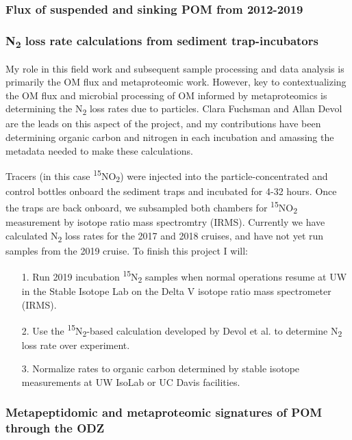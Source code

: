 \documentclass[12pt, letterpaper, twoside]{article}
\begin{document}
\bigskip

\subsubsection{Flux of suspended and sinking POM from 2012-2019}



\subsubsection{N\textsubscript{2} loss rate calculations from sediment trap-incubators}

My role in this field work and subsequent sample processing and data analysis is primarily the OM flux and metaproteomic work. However, key to contextualizing the OM flux and microbial processing of OM informed by metaproteomics is determining the N\textsubscript{2} loss rates due to particles. Clara Fuchsman and Allan Devol are the leads on this aspect of the project, and my contributions have been determining organic carbon and nitrogen in each incubation and amassing the metadata needed to make these calculations. 

Tracers (in this case \textsuperscript{15}NO\textsubscript{2}) were injected into the particle-concentrated and control bottles onboard the sediment traps and incubated for 4-32 hours. Once the traps are back onboard, we subsampled both chambers for \textsuperscript{15}NO\textsubscript{2} measurement by isotope ratio mass spectromtry (IRMS). Currently we have calculated N\textsubscript{2} loss rates for the 2017 and 2018 cruises, and have not yet run samples from the 2019 cruise. To finish this project I will:

\begin{enumerate}
	\item[1.] Run 2019 incubation \textsuperscript{15}N\textsubscript{2} samples when normal operations resume at UW in the Stable Isotope Lab on the Delta V isotope ratio mass spectrometer (IRMS). 
	\item[2.] Use the \textsuperscript{15}N\textsubscript{2}-based calculation developed by Devol et al. to determine N\textsubscript{2} loss rate over experiment. 
	\item [3.] Normalize rates to organic carbon determined by stable isotope measurements at UW IsoLab or UC Davis facilities. 
\end{enumerate}

\subsubsection{Metapeptidomic and metaproteomic signatures of POM through the ODZ}
\end{document}
